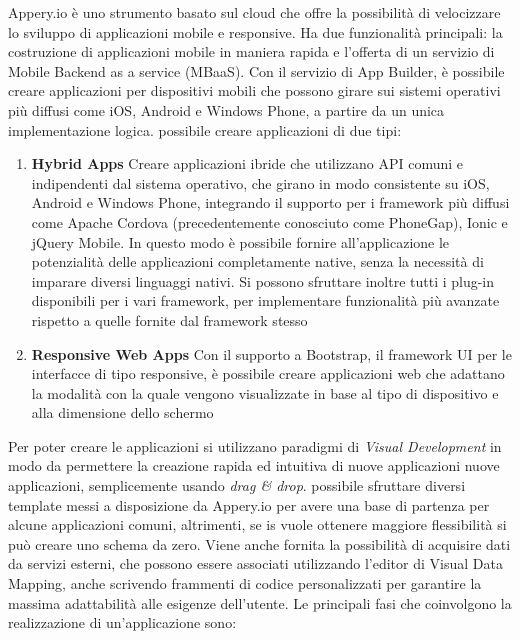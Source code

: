 Appery.io è uno strumento basato sul cloud che offre la possibilità di velocizzare lo sviluppo di applicazioni mobile e responsive. Ha due funzionalità principali: la costruzione di applicazioni mobile in maniera rapida e l'offerta di un servizio di Mobile Backend as a service (MBaaS).
Con il servizio di App Builder, è possibile creare applicazioni per dispositivi mobili che possono girare sui sistemi operativi più diffusi come iOS, Android e Windows Phone, a partire da un unica implementazione logica.
\upe possibile creare applicazioni di due tipi: 
\begin{enumerate}
	\item \textbf{Hybrid Apps} Creare applicazioni ibride che utilizzano API comuni e indipendenti dal sistema operativo, che girano in modo consistente su iOS, Android e Windows Phone, integrando il supporto per i framework più diffusi come Apache Cordova (precedentemente conosciuto come PhoneGap), Ionic e jQuery Mobile. In questo modo è possibile fornire all'applicazione le potenzialità delle applicazioni completamente native, senza la necessità di imparare diversi linguaggi nativi. Si possono sfruttare inoltre tutti i plug-in disponibili per i vari framework, per implementare funzionalità più avanzate rispetto a quelle fornite dal framework stesso
	\item \textbf{Responsive Web Apps}
	Con il supporto a Bootstrap, il framework UI per le interfacce di tipo responsive, è possibile creare applicazioni web che adattano la modalità con la quale vengono visualizzate in base al tipo di dispositivo e alla dimensione dello schermo
\end{enumerate}

Per poter creare le applicazioni si utilizzano paradigmi di \emph{Visual Development} in modo da permettere la creazione rapida ed intuitiva di nuove applicazioni nuove applicazioni, semplicemente usando \emph{drag \& drop}. \upe possibile sfruttare diversi template messi a disposizione da Appery.io per avere una base di partenza per alcune applicazioni comuni, altrimenti, se is vuole ottenere maggiore flessibilità si può creare uno schema da zero. Viene anche fornita la possibilità di acquisire dati da servizi esterni, che possono essere associati utilizzando l'editor di Visual Data Mapping, anche scrivendo frammenti di codice personalizzati per garantire la massima adattabilità alle esigenze dell'utente. Le principali fasi che coinvolgono la realizzazione di un'applicazione sono:


